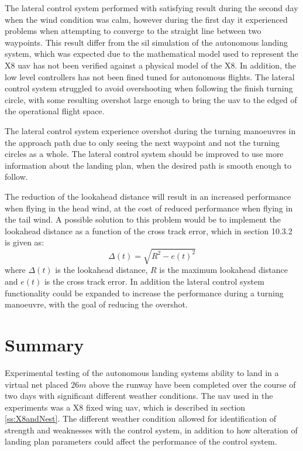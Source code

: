 The lateral control system performed with satisfying result during the second day when the wind condition was calm, however during the first day it experienced problems when attempting to converge to the straight line between two waypoints. This result differ from the \gls{sil} simulation of the autonomous landing system, which was expected due to the mathematical model used to represent the X8 \gls{uav} has not been verified against a physical model of the X8. In addition, the low level controllers has not been fined tuned for autonomous flights. The lateral control system  struggled to avoid overshooting when following the finish turning circle, with some resulting overshot large enough to bring the \gls{uav} to the edged of the operational flight space.

The lateral control system experience overshot during the turning manoeuvres in the approach path due to only seeing the next waypoint and not the turning circles as a whole. The lateral control system should be improved to use more information about the landing plan, when the desired path is smooth enough to follow.

The reduction of the lookahead distance will result in an increased performance when flying in the head wind, at the cost of reduced performance when flying in the tail wind. A possible solution to this problem would be to implement the lookahead distance as a function of the cross track error, which in \citep{fossen2011handbook} section 10.3.2 is given as:
\begin{equation}
\Delta(t) = \sqrt{R^2 - e(t)^2}
\end{equation}
where $\Delta(t)$ is the lookahead distance, $R$ is the maximum lookahead distance and $e(t)$ is the cross track error. In addition the lateral control system functionality could be expanded to increase the performance during a turning manoeuvre, with the goal of reducing the overshot.
\section{Summary}
Experimental testing of the autonomous landing systems ability to land in a virtual net placed $26 m $ above the runway have been completed over the course of two days with significant different weather conditions. The \gls{uav} used in the experiments was a X8 fixed wing \gls{uav}, which is described in section \ref{ss:X8andNest}. The different weather condition allowed for identification of strength and weaknesses with the control system, in addition to how alteration of landing plan parameters could affect the performance of the control system.

